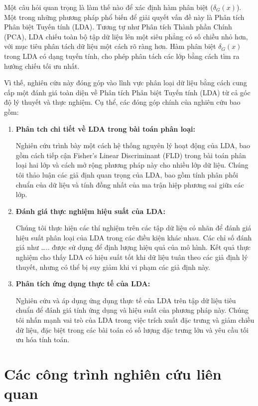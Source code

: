 \documentclass[
  a4paper,
]{article}
\begin{document}
Một câu hỏi quan trọng là làm thế nào để xác định hàm phân biệt
(\(\delta_G(x)\)). Một trong những phương pháp phổ biến để giải quyết
vấn đề này là Phân tích Phân biệt Tuyến tính (LDA). Tương tự như Phân
tích Thành phần Chính (PCA), LDA chiếu toàn bộ tập dữ liệu lên một siêu
phẳng có số chiều nhỏ hơn, với mục tiêu phân tách dữ liệu một cách rõ
ràng hơn. Hàm phân biệt \(\delta_G(x)\) trong LDA có dạng tuyến tính,
cho phép phân tách các lớp bằng cách tìm ra hướng chiếu tối ưu nhất.

Vì thế, nghiên cứu này đóng góp vào lĩnh vực phân loại dữ liệu bằng cách
cung cấp một đánh giá toàn diện về Phân tích Phân biệt Tuyến tính (LDA)
từ cả góc độ lý thuyết và thực nghiệm. Cụ thể, các đóng góp chính của
nghiên cứu bao gồm:

\begin{enumerate}
\def\labelenumi{\arabic{enumi}.}
\item
  \textbf{Phân tch chi tiết về LDA trong bài toán phân loại:}

  Nghiên cứu trình bày một cách hệ thống nguyên lý hoạt động của LDA,
  bao gồm cách tiếp cận Fisher's Linear Discriminant (FLD) trong bài
  toán phân loại hai lớp và cách mở rộng phương pháp này cho nhiều lớp
  dữ liệu. Chúng tôi thảo luận các giả định quan trọng của LDA, bao gồm
  tính phân phối chuẩn của dữ liệu và tính đồng nhất của ma trận hiệp
  phương sai giữa các lớp.
\item
  \textbf{Đánh giá thực nghiệm hiệu suất của LDA:}

  Chúng tôi thực hiện các thí nghiệm trên các tập dữ liệu có nhãn để
  đánh giá hiệu suất phân loại của LDA trong các điều kiện khác nhau.
  Các chỉ số đánh giá như \ldots.. được sử dụng để định lượng hiệu quả
  của mô hình. Kết quả thực nghiệm cho thấy LDA có hiệu suất tốt khi dữ
  liệu tuân theo các giả định lý thuyết, nhưng có thể bị suy giảm khi vi
  phạm các giả định này.
\item
  \textbf{Phân tích ứng dụng thực tế của LDA:}

  Nghiên cứu và áp dụng ứng dụng thực tế của LDA trên tập dữ liệu tiêu
  chuẩn để đánh giá tính ứng dụng và hiệu suất của phương pháp này.
  Chúng tôi nhấn mạnh vai trò của LDA trong việc trích xuất đặc trưng và
  giảm chiều dữ liệu, đặc biệt trong các bài toán có số lượng đặc trưng
  lớn và yêu cầu tối ưu hóa tính toán.
\end{enumerate}

\pagebreak

\section{Các công trình nghiên cứu liên
quan}\label{cuxe1c-cuxf4ng-truxecnh-nghiuxean-cux1ee9u-liuxean-quan}
\end{document}
